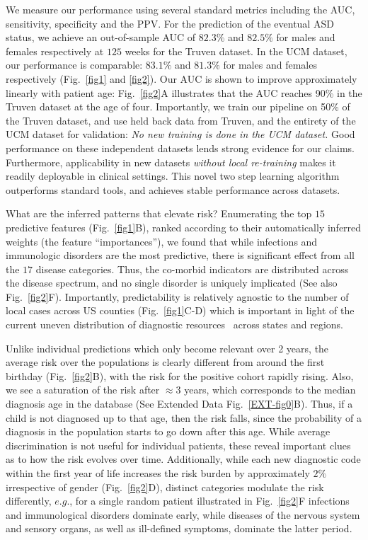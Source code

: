 \documentclass[onecolumn,,10pt]{IEEEtran}
\def\treatment{positive\xspace}
\begin{document}
We measure our performance using several standard metrics including the AUC, sensitivity, specificity and the PPV. For the prediction of the eventual ASD  status, we achieve an out-of-sample AUC of $82.3\%$ and  $82.5\%$ for males and females respectively at $125$ weeks for the Truven dataset. In the UCM dataset, our performance is comparable: $83.1\%$ and $81.3\%$ for males and females respectively (Fig.~\ref{fig1} and \ref{fig2}).  Our AUC is shown to improve approximately  linearly  with patient age: Fig.~\ref{fig2}A illustrates that the  AUC  reaches 90\%  in the Truven dataset at the age of four. Importantly, we train  our  pipeline on 50\% of the Truven dataset, and use held back data from Truven, and the entirety of the UCM dataset for validation: \textit{No new training is done in the UCM dataset.} Good  performance on these independent datasets lends strong evidence for our claims. Furthermore, applicability in new datasets \textit{without local re-training} makes it readily  deployable in clinical settings. This novel two step learning algorithm outperforms standard tools, and achieves  stable performance across datasets.


What are the inferred patterns that  elevate risk? %
Enumerating the top $15$ predictive features (Fig.~\ref{fig1}B), ranked  according to their automatically inferred weights  (the feature ``importances''), we found that while infections and immunologic disorders are the most predictive, there is significant effect from all the $17$ disease categories. Thus, the  co-morbid indicators are  distributed across the disease spectrum, and no single  disorder is uniquely implicated (See also Fig.~\ref{fig2}F). Importantly, predictability is relatively agnostic to the number of local cases across US counties (Fig.~\ref{fig1}C-D) which is important in light of the current uneven distribution of  diagnostic resources~\cite{gordon2016whittling,althouse2006pediatric} across states and regions.

Unlike individual predictions which only become relevant over 2 years, the average risk over the populations is clearly different  from around the  first birthday (Fig.~\ref{fig2}B), with the risk for the  \treatment cohort rapidly rising.
%
Also, we see a saturation of the risk after $\approx 3$ years, which corresponds to the median diagnosis age in the database (See Extended Data Fig.~\ref{EXT-fig0}B). Thus, if a child is not diagnosed up to that age, then the  risk  falls, since the probability of a diagnosis in the population starts to go down after this age. While average discrimination is not useful for individual patients, these reveal important clues as to how the  risk evolves over time. Additionally, while  each  new diagnostic code within the first year of life  increases the risk burden by approximately $2\%$ irrespective of gender (Fig.~\ref{fig2}D), distinct  categories modulate the risk differently, $e.g.$, for a single random patient  illustrated in Fig.~\ref{fig2}F infections and immunological disorders dominate early, while  diseases of the nervous system and sensory organs, as well as ill-defined symptoms,  dominate the latter period.
\end{document}
